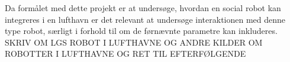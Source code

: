 Da formålet med dette projekt er at undersøge, hvordan en social robot kan integreres i en lufthavn er det relevant at undersøge interaktionen med denne type robot, særligt i forhold til om de førnævnte parametre kan inkluderes. \blankline
%
SKRIV OM LGS ROBOT I LUFTHAVNE OG ANDRE KILDER OM ROBOTTER I LUFTHAVNE OG RET TIL EFTERFØLGENDE\blankline
%

